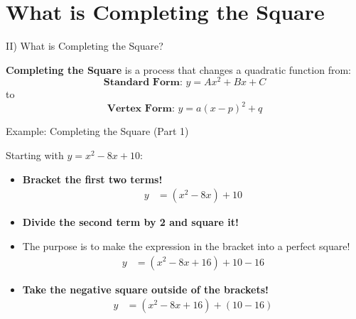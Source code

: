 \documentclass[aspectratio=169]{beamer}
\begin{document}
\section{What is Completing the Square}

\begin{frame}{II) What is Completing the Square?}
    \begin{tcolorbox}[colback=lightgray,colframe=primary,title=Key Concept]
        \footnotesize
        \textbf{Completing the Square} is a process that changes a quadratic function from:
        \[ \textbf{Standard Form: } y = Ax^2 + Bx + C \]
        to
        \[ \textbf{Vertex Form: } y = a(x-p)^2 + q \]
    \end{tcolorbox}
\end{frame}

\begin{frame}{Example: Completing the Square (Part 1)}
    \begin{tcolorbox}[colback=lightgray,colframe=accent,title=Example: $y = x^2 - 8x + 10$]
        \footnotesize
        Starting with $y = x^2 - 8x + 10$:
        \begin{itemize}
            \item \textbf{Bracket the first two terms!}
                \begin{align*}
                    y &= (x^2 - 8x) + 10
                \end{align*}
            \item \textbf{Divide the second term by 2 and square it!}
                \item The purpose is to make the expression in the bracket into a perfect square!
                \begin{align*}
                    y &= (x^2 - 8x + 16) + 10 - 16
                \end{align*}
            \item \textbf{Take the negative square outside of the brackets!}
                \begin{align*}
                    y &= (x^2 - 8x + 16) + (10 - 16)
                \end{align*}
        \end{itemize}
    \end{tcolorbox}
\end{frame}
\end{document}
